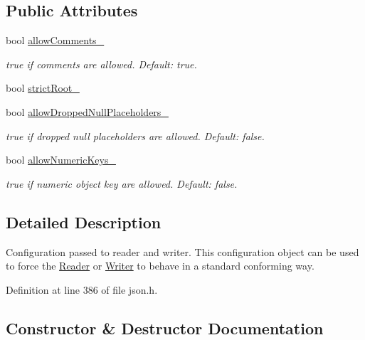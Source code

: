 \subsection*{Public Attributes}
\begin{DoxyCompactItemize}
\item 
bool \hyperlink{class_json_1_1_features_a33afd389719624b6bdb23950b3c346c9}{allow\+Comments\+\_\+}
\begin{DoxyCompactList}\small\item\em {\ttfamily true} if comments are allowed. Default\+: {\ttfamily true}. \end{DoxyCompactList}\item 
bool \hyperlink{class_json_1_1_features_a1162c37a1458adc32582b585b552f9c3}{strict\+Root\+\_\+}
\item 
bool \hyperlink{class_json_1_1_features_a5076aa72c05c7596ac339ede36c97a6a}{allow\+Dropped\+Null\+Placeholders\+\_\+}
\begin{DoxyCompactList}\small\item\em {\ttfamily true} if dropped null placeholders are allowed. Default\+: {\ttfamily false}. \end{DoxyCompactList}\item 
bool \hyperlink{class_json_1_1_features_aff3cb16b79d15d3d761b11a0dd6d4d6b}{allow\+Numeric\+Keys\+\_\+}
\begin{DoxyCompactList}\small\item\em {\ttfamily true} if numeric object key are allowed. Default\+: {\ttfamily false}. \end{DoxyCompactList}\end{DoxyCompactItemize}


\subsection{Detailed Description}
Configuration passed to reader and writer. This configuration object can be used to force the \hyperlink{class_json_1_1_reader}{Reader} or \hyperlink{class_json_1_1_writer}{Writer} to behave in a standard conforming way. 

Definition at line 386 of file json.\+h.



\subsection{Constructor \& Destructor Documentation}
\hypertarget{class_json_1_1_features_ad15a091cb61bb31323299a95970d2644}{}\label{class_json_1_1_features_ad15a091cb61bb31323299a95970d2644} 
